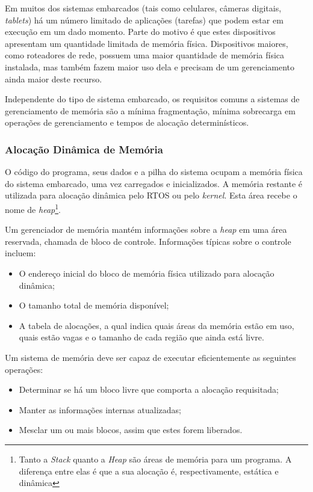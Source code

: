 Em muitos dos sistemas embarcados (tais como celulares, câmeras digitais, \emph{tablets}) há um número limitado de aplicações (tarefas) que  podem estar em execução em um dado momento. Parte do motivo é que estes dispositivos apresentam um quantidade limitada de memória física. Dispositivos maiores, como roteadores de rede, possuem uma maior quantidade de memória física instalada, mas também fazem maior uso dela e precisam de um gerenciamento ainda maior deste recurso.

Independente do tipo de sistema embarcado, os requisitos comuns a sistemas de gerenciamento de memória são a mínima fragmentação, mínima sobrecarga em operações de gerenciamento e tempos de alocação determinísticos.

\subsubsection{Alocação Dinâmica de Memória}

O código do programa, seus dados e a pilha do sistema ocupam a memória física do sistema embarcado, uma vez carregados e inicializados. A memória restante é utilizada para alocação dinâmica pelo RTOS ou pelo \emph{kernel}. Esta área recebe o nome de \emph{heap}\footnote{Tanto a \emph{Stack} quanto a \emph{Heap} são áreas de memória para um programa. A diferença entre elas é que a sua alocação é, respectivamente, estática e dinâmica}.

Um gerenciador de memória mantém informações sobre a \emph{heap} em uma área reservada, chamada de bloco de controle. Informações típicas sobre o controle incluem:

\begin{itemize}
	\item O endereço inicial do bloco de memória física utilizado para alocação dinâmica;
	\item O tamanho total de memória disponível;
	\item A tabela de alocações, a qual indica quais áreas da memória estão em uso, quais estão vagas e o tamanho de cada região que ainda está livre.
\end{itemize}

Um sistema de memória deve ser capaz de executar eficientemente as seguintes operações:

\begin{itemize}
	\item Determinar se há um bloco livre que comporta a alocação requisitada;
	\item Manter as informações internas atualizadas;
	\item Mesclar um ou mais blocos, assim que estes forem liberados.
\end{itemize}

